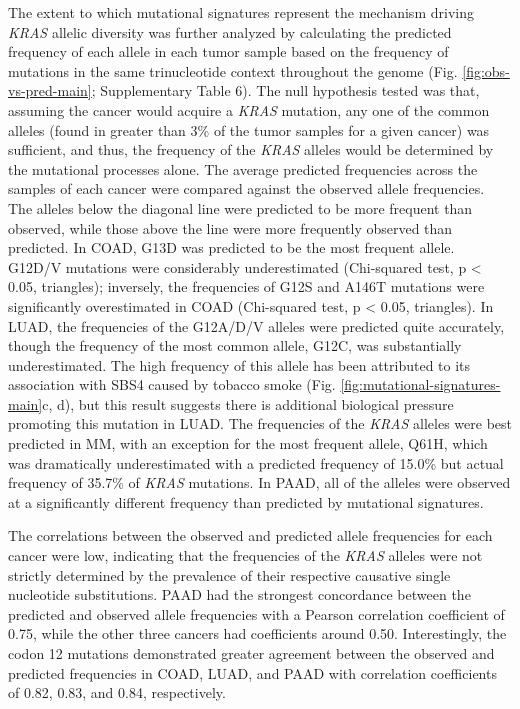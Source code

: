 \documentclass[english, 10pt, letterpaper]{article}
\newcommand{\KRAS}{\emph{KRAS}}
\begin{document}
The extent to which mutational signatures represent the mechanism driving \KRAS{} allelic diversity was further analyzed by calculating the predicted frequency of each allele in each tumor sample based on the frequency of mutations in the same trinucleotide context throughout the genome (Fig. \ref{fig:obs-vs-pred-main}; Supplementary Table 6).
The null hypothesis tested was that, assuming the cancer would acquire a \KRAS{} mutation, any one of the common alleles (found in greater than 3\% of the tumor samples for a given cancer) was sufficient, and thus, the frequency of the \KRAS{} alleles would be determined by the mutational processes alone.
The average predicted frequencies across the samples of each cancer were compared against the observed allele frequencies.
The alleles below the diagonal line were predicted to be more frequent than observed, while those above the line were more frequently observed than predicted.
In COAD, G13D was predicted to be the most frequent allele.
G12D/V mutations were considerably underestimated (Chi-squared test, p < 0.05, triangles); inversely, the frequencies of G12S and A146T mutations were significantly overestimated in COAD (Chi-squared test, p < 0.05, triangles).
In LUAD, the frequencies of the G12A/D/V alleles were predicted quite accurately, though the frequency of the most common allele, G12C, was substantially underestimated.
The high frequency of this allele has been attributed to its association with SBS4 caused by tobacco smoke (Fig. \ref{fig:mutational-signatures-main}c, d), but this result suggests there is additional biological pressure promoting this mutation in LUAD.
The frequencies of the \KRAS{} alleles were best predicted in MM, with an exception for the most frequent allele, Q61H, which was dramatically underestimated with a predicted frequency of 15.0\% but actual frequency of 35.7\% of \KRAS{} mutations.
In PAAD, all of the alleles were observed at a significantly different frequency than predicted by mutational signatures.

The correlations between the observed and predicted allele frequencies for each cancer were low, indicating that the frequencies of the \KRAS{} alleles were not strictly determined by the prevalence of their respective causative single nucleotide substitutions.
PAAD had the strongest concordance between the predicted and observed allele frequencies with a Pearson correlation coefficient of 0.75, while the other three cancers had coefficients around 0.50.
Interestingly, the codon 12 mutations demonstrated greater agreement between the observed and predicted frequencies in COAD, LUAD, and PAAD with correlation coefficients of 0.82, 0.83, and 0.84, respectively.
\end{document}
